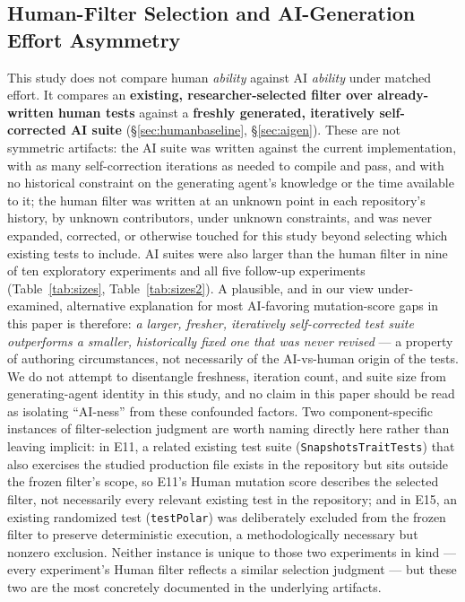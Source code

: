 \documentclass[10pt,conference]{IEEEtran}
\begin{document}
\subsection{Human-Filter Selection and AI-Generation Effort Asymmetry}
\label{sec:effortasymmetry}
This study does not compare human \emph{ability} against AI \emph{ability} under matched effort. It compares an \textbf{existing, researcher-selected filter over already-written human tests} against a \textbf{freshly generated, iteratively self-corrected AI suite} (\S\ref{sec:humanbaseline}, \S\ref{sec:aigen}). These are not symmetric artifacts: the AI suite was written against the current implementation, with as many self-correction iterations as needed to compile and pass, and with no historical constraint on the generating agent's knowledge or the time available to it; the human filter was written at an unknown point in each repository's history, by unknown contributors, under unknown constraints, and was never expanded, corrected, or otherwise touched for this study beyond selecting which existing tests to include. AI suites were also larger than the human filter in nine of ten exploratory experiments and all five follow-up experiments (Table~\ref{tab:sizes}, Table~\ref{tab:sizes2}). A plausible, and in our view under-examined, alternative explanation for most AI-favoring mutation-score gaps in this paper is therefore: \emph{a larger, fresher, iteratively self-corrected test suite outperforms a smaller, historically fixed one that was never revised} — a property of authoring circumstances, not necessarily of the AI-vs-human origin of the tests. We do not attempt to disentangle freshness, iteration count, and suite size from generating-agent identity in this study, and no claim in this paper should be read as isolating ``AI-ness'' from these confounded factors. Two component-specific instances of filter-selection judgment are worth naming directly here rather than leaving implicit: in E11, a related existing test suite (\texttt{SnapshotsTraitTests}) that also exercises the studied production file exists in the repository but sits outside the frozen filter's scope, so E11's Human mutation score describes the selected filter, not necessarily every relevant existing test in the repository; and in E15, an existing randomized test (\texttt{testPolar}) was deliberately excluded from the frozen filter to preserve deterministic execution, a methodologically necessary but nonzero exclusion. Neither instance is unique to those two experiments in kind — every experiment's Human filter reflects a similar selection judgment — but these two are the most concretely documented in the underlying artifacts.
\end{document}
